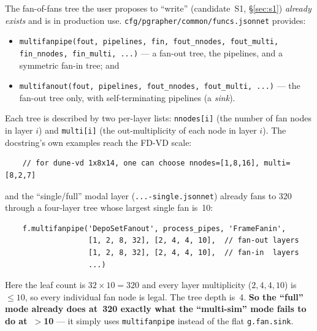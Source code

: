 \documentclass[11pt]{article}
\newcommand{\code}[1]{\texttt{#1}}
\newcommand{\file}[1]{\texttt{\small #1}}
\begin{document}
The fan-of-fans tree the user proposes to ``write'' (candidate~S1,
\S\ref{sec:s1}) \emph{already exists} and is in production use.
\file{cfg/pgrapher/common/funcs.jsonnet} provides:

\begin{itemize}
\item \code{multifanpipe(fout, pipelines, fin, fout\_nnodes, fout\_multi,
  fin\_nnodes, fin\_multi, ...)} --- a fan-out tree, the pipelines, and a
  symmetric fan-in tree; and
\item \code{multifanout(fout, pipelines, fout\_nnodes, fout\_multi, ...)} --- the
  fan-out tree only, with self-terminating pipelines (a \emph{sink}).
\end{itemize}

\noindent
Each tree is described by two per-layer lists: \code{nnodes[i]} (the number of fan
nodes in layer $i$) and \code{multi[i]} (the out-multiplicity of each node in
layer $i$).  The docstring's own examples reach the FD-VD scale:

\begin{verbatim}
    // for dune-vd 1x8x14, one can choose nnodes=[1,8,16], multi=[8,2,7]
\end{verbatim}

\noindent
and the ``single/full'' modal layer
(\file{...-single.jsonnet}) already fans to 320 through a four-layer tree whose
largest single fan is~10:

\begin{verbatim}
    f.multifanpipe('DepoSetFanout', process_pipes, 'FrameFanin',
                   [1, 2, 8, 32], [2, 4, 4, 10],  // fan-out layers
                   [1, 2, 8, 32], [2, 4, 4, 10],  // fan-in  layers
                   ...)
\end{verbatim}

\noindent
Here the leaf count is $32\times10=320$ and every layer multiplicity
($2,4,4,10$) is $\le 10$, so every individual fan node is legal.  The tree depth
is~4.  \textbf{So the ``full'' mode already does at~320 exactly what the
``multi-sim'' mode fails to do at~$>$10} --- it simply uses \code{multifanpipe}
instead of the flat \code{g.fan.sink}.
\end{document}
